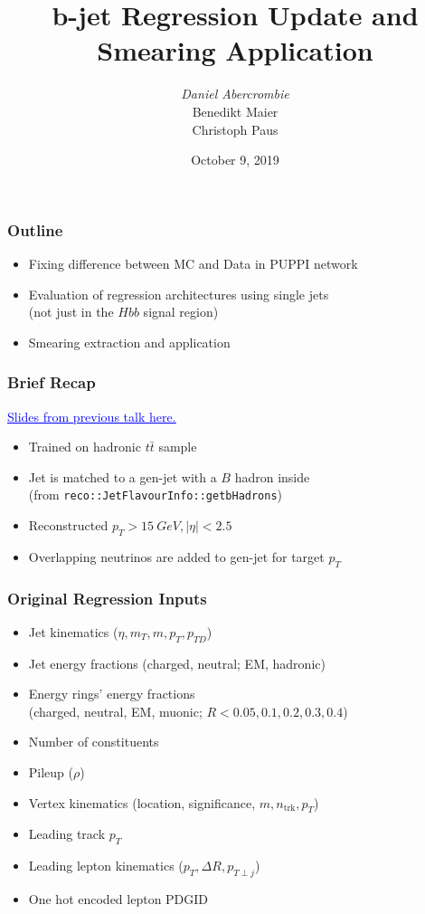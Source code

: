 \documentclass{beamer}
\author[D. Abercrombie]{
  \emph{Daniel Abercrombie} \\
  Benedikt Maier \\
  Christoph Paus
}
\title{\bf \sffamily b-jet Regression Update and Smearing Application}
\date{October 9, 2019}
\newcommand{\link}[2]{\href{#2}{\textcolor{blue}{\underline{#1}}}}
\begin{document}
\begin{frame}
  \titlepage
\end{frame}

\begin{frame}
  \frametitle{Outline}

  \begin{itemize}
  \item Fixing difference between MC and Data in PUPPI network
  \item Evaluation of regression architectures using single jets \\
    (not just in the $Hbb$ signal region)
  \item Smearing extraction and application
  \end{itemize}

\end{frame}


\begin{frame}
  \frametitle{Brief Recap}
  \link{Slides from previous talk here.}
       {https://indico.cern.ch/event/788750/contributions/3529492/attachments/1893446/3123086/dabercro_hbb_190814.pdf}

  \begin{itemize}
  \item Trained on hadronic $t\bar{t}$ sample
  \item Jet is matched to a gen-jet with a $B$ hadron inside \\
    (from \texttt{reco::JetFlavourInfo::getbHadrons})
  \item Reconstructed $p_T > \SI{15}{GeV}, |\eta| < 2.5$
  \item Overlapping neutrinos are added to gen-jet for target $p_T$
  \end{itemize}

\end{frame}


\begin{frame}
  \frametitle{Original Regression Inputs}

  \begin{itemize}
  \item Jet kinematics ($\eta, m_T, m, p_T, p_{TD}$)
  \item Jet energy fractions (charged, neutral; EM, hadronic)
  \item Energy rings' energy fractions \\
    (charged, neutral, EM, muonic; $R < 0.05, 0.1, 0.2, 0.3, 0.4$)
  \item Number of constituents
  \item Pileup ($\rho$)
  \item Vertex kinematics (location, significance, $m, n_\mathrm{trk}, p_T$)
  \item Leading track $p_T$
  \item Leading lepton kinematics ($p_T, \Delta R, p_{T\perp j}$)
  \item One hot encoded lepton PDGID
  \end{itemize}

\end{frame}
\end{document}
